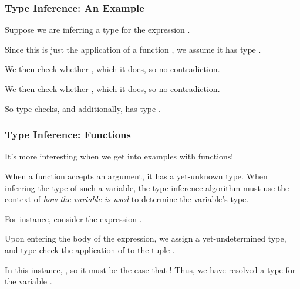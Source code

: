 \documentclass[aspectratio=169, handout]{beamer}
\begin{document}
\begin{frame}[fragile]
  \frametitle{Type Inference: An Example}

  Suppose we are inferring a type for the expression .

  \pause
  \vspace{\fill}

  Since this is just the application of a function ,
  we assume it has type .

  \pause
  \vspace{\fill}

  We then check whether , which it does, so no contradiction.

  \pause
  \vspace{\fill}

  We then check whether , which it does, so no contradiction.

  \pause
  \vspace{\fill}

  So  type-checks, and additionally, has type .
\end{frame}

\begin{frame}[fragile]
  \frametitle{Type Inference: Functions}

  It's more interesting when we get into examples with functions!

  \pause
  \vspace{\fill}

  When a function accepts an argument, it has a yet-unknown type. When
  inferring the type of such a variable, the type inference algorithm must
  use the context of \textit{how the variable is used} to determine the
  variable's type.

  \pause
  \vspace{\fill}

  For instance, consider the expression .

  \pause
  \vspace{\fill}

  Upon entering the body of the expression, we assign  a yet-undetermined
  type, and type-check the application of \code{+} to the tuple .

  \pause
  \vspace{\fill}

  In this instance, , so it must be the case that
  ! Thus, we have resolved a type for the variable .
\end{frame}
\end{document}
